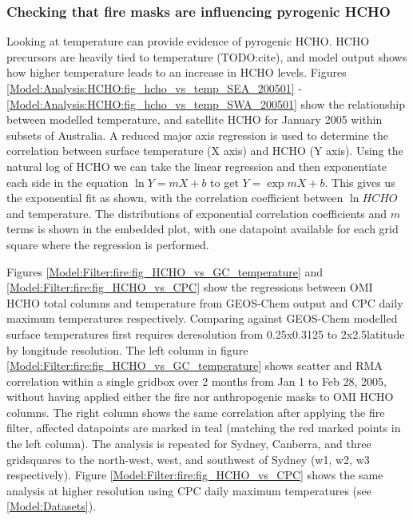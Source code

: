   
    \subsubsection{Checking that fire masks are influencing pyrogenic HCHO}
      
      Looking at temperature can provide evidence of pyrogenic HCHO.
      HCHO precursors are heavily tied to temperature (TODO:cite), and model output shows how higher temperature leads to an increase in HCHO levels.
      Figures \ref{Model:Analysis:HCHO:fig_hcho_vs_temp_SEA_200501} - \ref{Model:Analysis:HCHO:fig_hcho_vs_temp_SWA_200501} show the relationship between modelled temperature, and satellite HCHO for January 2005 within subsets of Australia.
      A reduced major axis regression is used to determine the correlation between surface temperature (X axis) and HCHO (Y axis).
      Using the natural log of HCHO we can take the linear regression and then exponentiate each side in the equation $\ln{Y} = m{X}+b$ to get ${Y} = \exp{m{X}+b}$. 
      This gives us the exponential fit as shown, with the correlation coefficient between $\ln{HCHO}$ and temperature.
      The distributions of exponential correlation coefficients and $m$ terms is shown in the embedded plot, with one datapoint available for each grid square where the regression is performed.
      
      Figures \ref{Model:Filter:fire:fig_HCHO_vs_GC_temperature} and \ref{Model:Filter:fire:fig_HCHO_vs_CPC} show the regressions between OMI HCHO total columns and temperature from GEOS-Chem output and CPC daily maximum temperatures respectively.
      Comparing against GEOS-Chem modelled surface temperatures first requires deresolution from 0.25x0.3125 to 2x2.5\degr latitude by longitude resolution.
      The left column in figure \ref{Model:Filter:fire:fig_HCHO_vs_GC_temperature} shows scatter and RMA correlation within a single gridbox over 2 months from Jan 1 to Feb 28, 2005, without having applied either the fire nor anthropogenic masks to OMI HCHO columns. 
      The right column shows the same correlation after applying the fire filter, affected datapoints are marked in teal (matching the red marked points in the left column).
      The analysis is repeated for Sydney, Canberra, and three gridsquares to the north-west, west, and southwest of Sydney (w1, w2, w3 respectively).
      Figure \ref{Model:Filter:fire:fig_HCHO_vs_CPC} shows the same analysis at higher resolution using CPC daily maximum temperatures (see \ref{Model:Datasets}).
      
